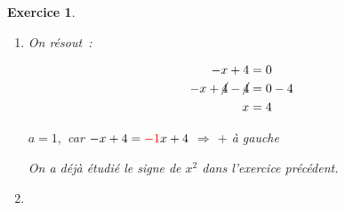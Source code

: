 \documentclass[10pt]{article}
\newtheorem{exo}{Exercice}
\begin{document}
\begin{exo}
\begin{enumerate}
\begin{multicols}{2}
\columnbreak

\begin{align*}
4t&=0\\
\frac{\cancel{4}t}{\cancel{4}}&=\frac{0}{4}\\
t&=0
 \end{align*}
 
 $a=4$ $\Rightarrow$ $+$ à droite
\end{multicols}

\medskip



\begin{center}
\end{center}

\item

\setlength{\columnseprule}{1pt}

\begin{multicols}{2}

On résout~:

\begin{align*}
-x+4&=0\\
-x+\cancel{4}-\cancel{4}&=0-4\\
x&=4
\end{align*}

$a=1,$ car $-x+4=\textcolor{red}{-1}x+4$ $\Rightarrow$ $+$ à gauche

\columnbreak

On a déjà étudié le signe de $x^2$ dans l'exercice précédent.

\end{multicols}

\medskip



\begin{center}
\end{center}

\item \setlength{\columnseprule}{1pt}

\begin{multicols}{2}


\end{multicols}
\end{enumerate}
\end{exo}
\end{document}
